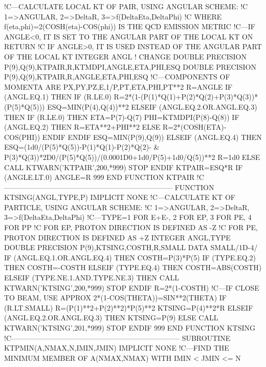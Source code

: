 !C---CALCULATE LOCAL KT OF PAIR, USING ANGULAR SCHEME:
!C   1=>ANGULAR, 2=>DeltaR, 3=>f(DeltaEta,DeltaPhi)
!C   WHERE f(eta,phi)=2(COSH(eta)-COS(phi)) IS THE QCD EMISSION METRIC
!C---IF ANGLE<0, IT IS SET TO THE ANGULAR PART OF THE LOCAL KT ON RETURN
!C   IF ANGLE>0, IT IS USED INSTEAD OF THE ANGULAR PART OF THE LOCAL KT
      INTEGER ANGL
! CHANGE      DOUBLE PRECISION P(9),Q(9),KTPAIR,R,KTMDPI,ANGLE,ETA,PHI,ESQ
      DOUBLE PRECISION P(9),Q(9),KTPAIR,R,ANGLE,ETA,PHI,ESQ
!C---COMPONENTS OF MOMENTA ARE PX,PY,PZ,E,1/P,PT,ETA,PHI,PT**2
      R=ANGLE
      IF (ANGL.EQ.1) THEN
         IF (R.LE.0) R=2*(1-(P(1)*Q(1)+P(2)*Q(2)+P(3)*Q(3))*(P(5)*Q(5)))
         ESQ=MIN(P(4),Q(4))**2
      ELSEIF (ANGL.EQ.2.OR.ANGL.EQ.3) THEN
         IF (R.LE.0) THEN
            ETA=P(7)-Q(7)
            PHI=KTMDPI(P(8)-Q(8))
            IF (ANGL.EQ.2) THEN
               R=ETA**2+PHI**2
            ELSE
               R=2*(COSH(ETA)-COS(PHI))
            ENDIF
         ENDIF
         ESQ=MIN(P(9),Q(9))
      ELSEIF (ANGL.EQ.4) THEN
         ESQ=(1d0/(P(5)*Q(5))-P(1)*Q(1)-P(2)*Q(2)- &
              P(3)*Q(3))*2D0/(P(5)*Q(5))/(0.0001D0+1d0/P(5)+1d0/Q(5))**2
         R=1d0
      ELSE
         CALL KTWARN('KTPAIR',200,*999)
         STOP
      ENDIF
      KTPAIR=ESQ*R
      IF (ANGLE.LT.0) ANGLE=R
999 END FUNCTION KTPAIR
!C-----------------------------------------------------------------------
    FUNCTION KTSING(ANGL,TYPE,P)
      IMPLICIT NONE
!C---CALCULATE KT OF PARTICLE, USING ANGULAR SCHEME:
!C   1=>ANGULAR, 2=>DeltaR, 3=>f(DeltaEta,DeltaPhi)
!C---TYPE=1 FOR E+E-, 2 FOR EP, 3 FOR PE, 4 FOR PP
!C   FOR EP, PROTON DIRECTION IS DEFINED AS -Z
!C   FOR PE, PROTON DIRECTION IS DEFINED AS +Z
      INTEGER ANGL,TYPE
      DOUBLE PRECISION P(9),KTSING,COSTH,R,SMALL
      DATA SMALL/1D-4/
      IF (ANGL.EQ.1.OR.ANGL.EQ.4) THEN
         COSTH=P(3)*P(5)
         IF (TYPE.EQ.2) THEN
            COSTH=-COSTH
         ELSEIF (TYPE.EQ.4) THEN
            COSTH=ABS(COSTH)
         ELSEIF (TYPE.NE.1.AND.TYPE.NE.3) THEN
            CALL KTWARN('KTSING',200,*999)
            STOP
         ENDIF
         R=2*(1-COSTH)
!C---IF CLOSE TO BEAM, USE APPROX 2*(1-COS(THETA))=SIN**2(THETA)
         IF (R.LT.SMALL) R=(P(1)**2+P(2)**2)*P(5)**2
         KTSING=P(4)**2*R
      ELSEIF (ANGL.EQ.2.OR.ANGL.EQ.3) THEN
         KTSING=P(9)
      ELSE
         CALL KTWARN('KTSING',201,*999)
         STOP
      ENDIF
999 END FUNCTION KTSING
!C-----------------------------------------------------------------------
    SUBROUTINE KTPMIN(A,NMAX,N,IMIN,JMIN)
      IMPLICIT NONE
!C---FIND THE MINIMUM MEMBER OF A(NMAX,NMAX) WITH IMIN < JMIN <= N
